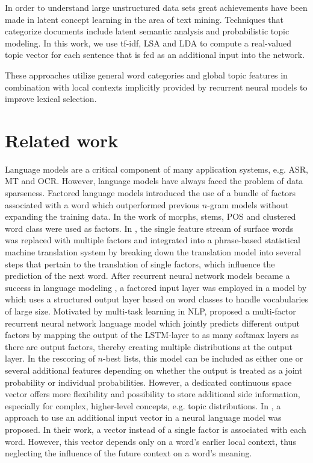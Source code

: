 \documentclass[a4paper]{article}
\begin{document}
In order to understand large unstructured data sets great achievements have been made in latent concept learning in the area of text mining. Techniques that categorize documents include latent semantic analysis and probabilistic topic modeling. In this work, we use tf-idf, LSA and LDA to compute a real-valued topic vector for each sentence that is fed as an additional input into the network. 

These approaches utilize general word categories and global topic features in combination with local contexts implicitly provided by recurrent neural models to improve lexical selection. 


\section{Related work}
Language models are a critical component of many application systems, e.g. ASR, MT and OCR. However, language models have always faced the problem of data sparseness. Factored language models \cite{bilmes2003factored} introduced the use of a bundle of factors associated with a word which outperformed previous $n$-gram models without expanding the training data. In the work of \cite{bilmes2003factored} morphs, stems, POS and clustered word class were used as factors. In \cite{koehn2007factored}, the single feature stream of surface words was replaced with multiple factors and integrated into a phrase-based statistical machine translation system by breaking down the translation model into several steps that pertain to the translation of single factors, which influence the prediction of the next word.
After recurrent neural network models became a success in language modeling \cite{mikolov2010recurrent}, a factored input layer was employed in a model by \cite{wu2012factored} which uses a structured output layer based on word classes to handle vocabularies of large size.
Motivated by multi-task learning in NLP, \cite{niehuesusing} proposed a multi-factor recurrent neural network language model which jointly predicts different output factors by mapping the output of the LSTM-layer \cite{hochreiter1997long} to as many softmax layers as there are output factors, thereby creating multiple distributions at the output layer. In the rescoring of $n$-best lists, this model can be included as either one or several additional features depending on whether the output is treated as a joint probability or individual probabilities.
However, a dedicated continuous space vector offers more flexibility and possibility to store additional side information, especially for complex, higher-level concepts, e.g. topic distributions. In \cite{mikolov2012context}, a approach to use an additional input vector in a neural language model was proposed. In their work, a vector instead of a single factor is associated with each word. However, this vector depends only on a word's earlier local context, thus neglecting the influence of the future context on a word's meaning. 
\end{document}

